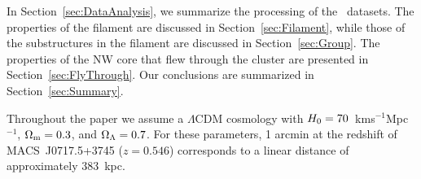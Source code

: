 In Section~\ref{sec:DataAnalysis}, we summarize the processing of the \chandra\ datasets. The properties of the filament are discussed in Section~\ref{sec:Filament}, while those of the substructures in the filament are discussed in Section~\ref{sec:Group}. The properties of the NW core that flew through the cluster are presented in Section~\ref{sec:FlyThrough}. Our conclusions are summarized in Section~\ref{sec:Summary}.

Throughout the paper we assume a $\Lambda$CDM cosmology with $H_{\rm 0} = 70$~km\;s$^{-1}$\;Mpc$^{-1}$, $\Omega_{\rm m} = 0.3$, and $\Omega_{\rm \Lambda} = 0.7$. For these parameters, 1 arcmin at the redshift of MACS~J0717.5+3745 ($z=0.546$) corresponds to a linear distance of approximately 383~kpc. 

